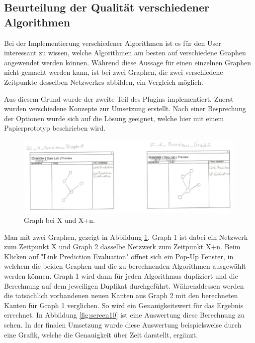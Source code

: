 \subsection{Beurteilung der Qualität verschiedener Algorithmen}

Bei der Implementierung verschiedener Algorithmen ist es für den User interessant zu wissen, welche Algorithmen am
besten auf verschiedene Graphen angewendet werden können. Während diese Aussage für einen einzelnen Graphen nicht gemacht
werden kann, ist bei zwei Graphen, die zwei verschiedene Zeitpunkte desselben Netzwerkes abbilden, ein Vergleich möglich.

Aus diesem Grund wurde der zweite Teil des Plugins implementiert. Zuerst wurden verschiedene Konzepte zur Umsetzung
erstellt. Nach einer Besprechung der Optionen wurde sich auf die Lösung geeignet, welche hier mit einem Papierprototyp
beschrieben wird.

\begin{figure}
    \includegraphics[width=\linewidth]{resources/EV-1.png}
    \caption{Graph bei X und X+n.}
    \label{fig:screen8}
\end{figure}

Man mit zwei Graphen, gezeigt in Abbildung \ref{fig:screen8}. Graph 1 ist dabei ein Netzwerk zum Zeitpunkt X und Graph 2
dasselbe Netzwerk zum Zeitpunkt X+n. Beim Klicken auf "Link Prediction Evaluation" öffnet sich ein Pop-Up Fenster, in
welchem die beiden Graphen und die zu berechnenden Algorithmen ausgewählt werden können. Graph 1 wird dann für jeden
Algorithmus dupliziert und die Berechnung auf dem jeweiligen Duplikat durchgeführt. Währenddessen werden die tatsächlich
vorhandenen neuen Kanten aus Graph 2 mit den berechneten Kanten für Graph 1 verglichen. So wird ein Genauigkeitswert für
das Ergebnis errechnet. In Abbildung \ref{fig:screen10} ist eine Auswertung diese Berechnung zu sehen. In der finalen
Umsetzung wurde diese Auswertung beispielsweise durch eine Grafik, welche die Genauigkeit über Zeit darstellt, ergänzt.

